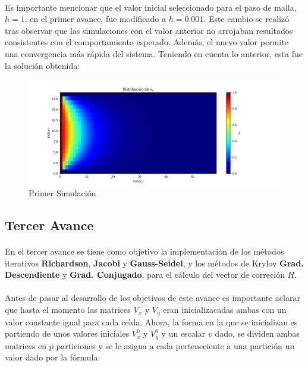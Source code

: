 \documentclass{article}
\begin{document}
  \paragraph{}
  Es importante mencionar que el valor inicial seleccionado para el paso de malla, $h=1$, en el primer avance, fue modificado a $h=0.001$. Este cambio se realizó tras observar que las simulaciones con el valor anterior no arrojaban resultados consistentes con el comportamiento esperado. Además, el nuevo valor permite una convergencia más rápida del sistema. Teniendo en cuenta lo anterior, esta fue la solución obtenida:

  \begin{figure}[H]
    \centering
    \includegraphics[width=1.2\textwidth]{GaussJordanSol.png}
    \caption{Primer Simulación}
  \end{figure}

  \subsection*{Tercer Avance}
  \paragraph{}
  En el tercer avance se tiene como objetivo la implementación de los métodos iterativos \textbf{Richardson}, \textbf{Jacobi} y \textbf{Gauss-Seidel}, y los métodos de Krylov \textbf{Grad. Descendiente} y \textbf{Grad. Conjugado}, para el cálculo del vector de correción $H$.

  \paragraph{}
  Antes de pasar al desarrollo de los objetivos de este avance es importante aclarar que hasta el momento las matrices $V_x$ y $V_y$ eran inicializacadas ambas con un valor constante igual para cada celda. Ahora, la forma en la que se inicializan es partiendo de unos valores iniciales $V_x^{0}$ y $V_y^{0}$ y un escalar $v$ dado, se dividen ambas matrices en $p$ particiones y se le asigna a cada perteneciente a una partición un valor dado por la fórmula:
\end{document}
